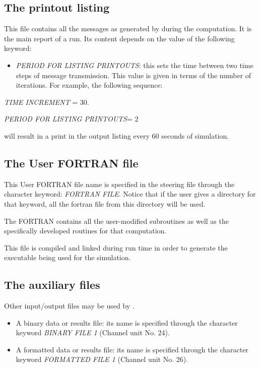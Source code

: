 \subsection{ The printout listing}

This file contains all the messages as generated by \tomawac during the computation.
It is the main report of a \tomawac run. Its content depends on the value of the
following keyword:

\begin{itemize}
\item  \textit{PERIOD FOR LISTING PRINTOUTS}: this sets the time between two time steps
  of message transmission. This value is given in terms of the number of iterations.
  For example, the following sequence:
\end{itemize}

\textit{TIME INCREMENT} = 30.    

\textit{PERIOD FOR LISTING PRINTOUTS}= 2 

will result in a print in the output listing every 60 seconds of simulation.

\subsection{ The User FORTRAN file}

This User FORTRAN file name is specified in the steering file through the character
keyword: \textit{FORTRAN FILE}. Notice that if the user gives a directory for that
keyword, all the fortran file from this directory will be used.  

The FORTRAN contains all the user-modified \tomawac subroutines as well as the
specifically developed routines for that computation.

This file is compiled and linked during run time in order to generate the executable
being used for the simulation.


\subsection{ The auxiliary files}

 Other input/output files may be used by \tomawac.

\begin{itemize}
\item  A binary data or results file: its name is specified through the character
  keyword \textit{BINARY FILE 1} (Channel unit No. 24).
\item  A formatted data or results file: its name is specified through the character
  keyword \textit{FORMATTED FILE 1} (Channel unit No. 26).
\end{itemize}


